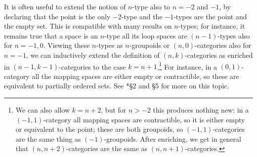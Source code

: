 \documentclass[a4paper,11pt]{article}
\begin{document}
\begin{remark}
  It is often useful to extend the notion of $n$-type also to $n = -2$
  and $-1$, by declaring that the point is the only $-2$-type and the
  $-1$-types are the point and the empty set. This is compatible with
  many results on $n$-types; for instance, it remains true that a
  space is an $n$-type \IFF{} all its loop spaces are $(n-1)$-types
  also for $n = -1,0$. Viewing these $n$-types as $n$-groupoids or
  $(n,0)$-categories also for $n = -1$, we can inductively extend the
  definition of $(n,k)$-categories as \icats{} enriched in
  $(n-1,k-1)$-categories to the case $k = n+1$.\footnote{We can also
    allow $k = n+2$, but for $n > -2$ this produces nothing new: in a
    $(-1,1)$-category all mapping spaces are contractible, so it is
    either empty or equivalent to the point; these are both groupoids,
    so $(-1,1)$-categories are the same thing as
    $(-1)$-groupoids. After enriching, we get in general that
    $(n,n+2)$-categories are the same as $(n,n+1)$-categories.}
  For instance, in a $(0,1)$-category all the
  mapping spaces are either empty or contractible, so these are
  equivalent to partially ordered sets. See \cite{BaezShulman}*{\S 2
    and \S 5} for more on this topic.
\end{remark}
\end{document}
